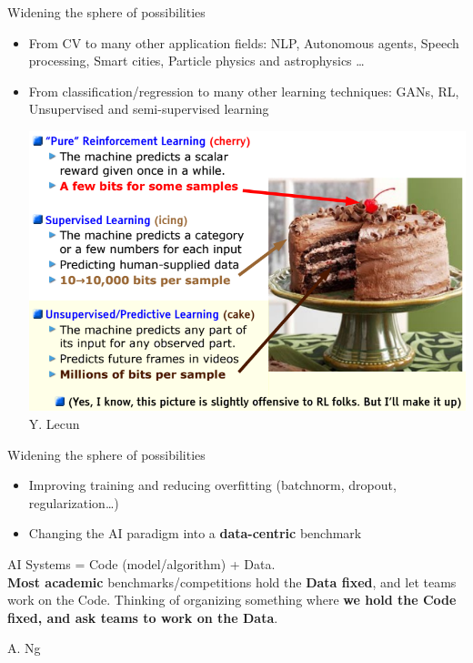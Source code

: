 \documentclass[usenames,dvipsnames]{beamer}
\begin{document}
    \begin{frame}{\secname}
        Widening the sphere of possibilities
        \begin{itemize}
            \item From CV to many other application fields: NLP, Autonomous agents, Speech processing, Smart cities, Particle physics and astrophysics \dots
            \item From classification/regression to many other learning techniques: GANs, RL, Unsupervised and semi-supervised learning
            \begin{center}
                \includegraphics[width=0.5\linewidth]{figures/WrapUp/Lecun_ML_cake.png} {\tiny Y. Lecun}
            \end{center}
        \end{itemize}
    \end{frame}
    \begin{frame}{\secname}
        Widening the sphere of possibilities
        \begin{itemize}
            \item Improving training and reducing overfitting (batchnorm, dropout, regularization\dots)
            \item Changing the AI paradigm into a \textbf{data-centric} benchmark
        \end{itemize}
        
        \epigraph{AI Systems =  Code (model/algorithm) + Data.\\
        \vspace{1em}\textbf{Most academic} benchmarks/competitions hold the \textbf{Data fixed}, and let teams work on the Code. Thinking of organizing something where \textbf{we hold the Code fixed, and ask teams to work on the Data}. }{A. Ng}
    \end{frame}
\end{document}
